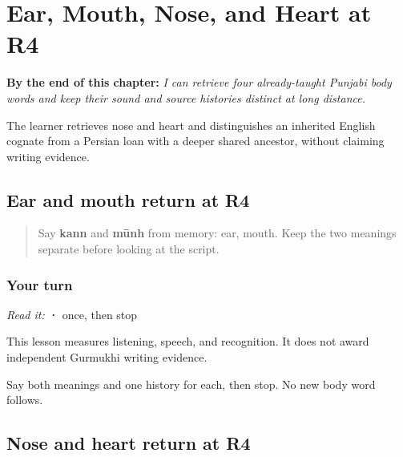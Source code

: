 
\chapter{Ear, Mouth, Nose, and Heart at R4}
\label{ch:pa-body-words-r4}

\begin{chapteropening}
\textbf{By the end of this chapter:} \emph{I can retrieve four already-taught Punjabi body words and keep their sound and source histories distinct at long distance.}

The learner retrieves nose and heart and distinguishes an inherited English cognate from a Persian loan with a deeper shared ancestor, without claiming writing evidence.
\end{chapteropening}

\section[Practice]{Ear and mouth return at R4}

\label{lesson:PA-R27-ear-mouth-r4}



\begin{quote}
Say \textbf{kann} and \textbf{mūnh} from memory: ear, mouth. Keep the two meanings separate before looking at the script.
\end{quote}

\subsection*{Your turn}
\emph{Read it:} \textbf{ · } once, then stop

This lesson measures listening, speech, and recognition. It does not award independent Gurmukhi writing evidence.

\begin{tcolorbox}[breakable,colback=teal!4,colframe=teal!35!black,title={Before you move on}]
Say both meanings and one history for each, then stop. No new body word follows.
\end{tcolorbox}
\section[Practice]{Nose and heart return at R4}

